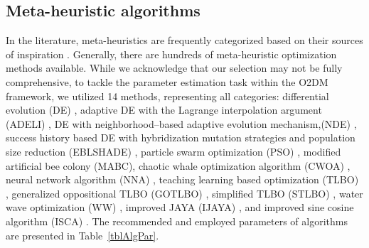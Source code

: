 \documentclass[a4paper,fleqn]{cas-dc}
\begin{document}
\subsection{Meta-heuristic algorithms}\label{MHA}
In the literature, meta-heuristics are frequently categorized based on their sources of inspiration \cite{WhiteShark,Gannet,Dandelion}.
Generally, there are hundreds of meta-heuristic optimization methods available.
While we acknowledge that our selection may not be fully comprehensive,
to tackle the parameter estimation task within the O2DM framework,
we utilized 14 methods, representing all categories:
differential evolution (DE) \cite{DEWang,P-DE_Ishaque},
adaptive DE with the Lagrange interpolation argument (ADELI) \cite{ADELI},
DE with neighborhood--based adaptive evolution mechanism,(NDE) \cite{NDE},
success history based DE with hybridization mutation strategies and population size reduction (EBLSHADE) \cite{EBLSHADE},
particle swarm optimization (PSO) \cite{PSO},
modified artificial bee colony (MABC)\cite{MABC},
chaotic whale optimization algorithm (CWOA) \cite{WOA},
neural network algorithm (NNA) \cite{NNA},
teaching learning based optimization (TLBO) \cite{TLBO_Patel},
generalized oppositional TLBO (GOTLBO) \cite{GOTLBO},
simplified TLBO (STLBO) \cite{STLBO},
water wave optimization (WW) \cite{WW},
improved JAYA (IJAYA) \cite{IJAYA},
and improved sine cosine algorithm (ISCA) \cite{SCA,ISCA2,ISCA3}.
The recommended and employed parameters of algorithms are presented in Table~\ref{tblAlgPar}.
\end{document}
